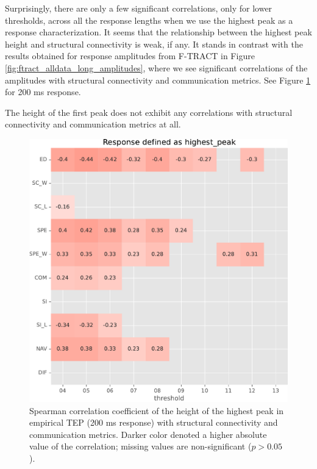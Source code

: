 Surprisingly, there are only a few significant correlations, only for lower thresholds, across all the response lengths when we use the highest peak as a response characterization. It seems that the relationship between the highest peak height and structural connectivity is weak, if any. It stands in contrast with the results obtained for response amplitudes from F-TRACT in Figure \ref{fig:ftract_alldata_long_amplitudes}, where we see significant correlations of the amplitudes with structural connectivity and communication metrics. See Figure \ref{fig:tms_heighest_200} for 200 ms response.

The height of the first peak does not exhibit any correlations with structural connectivity and communication metrics at all. 

\begin{figure}
    \centering
    \includegraphics[width=\textwidth]{images/nootebook_generated/tmseeg_results/empirical/200/not_over_threshold_nan/Response defined as highest_peak.pdf}
    \caption[TEPs highest peak (200 ms) correlations]{Spearman correlation coefficient of the height of the highest peak in empirical TEP (200 ms response) with structural connectivity and communication metrics. Darker color denoted a higher absolute value of the correlation; missing values are non-significant ($p>0.05$).}
    \label{fig:tms_heighest_200}
\end{figure}

